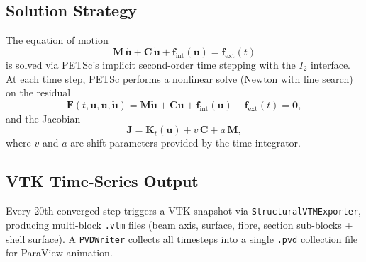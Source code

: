 \subsection{Solution Strategy}

The equation of motion
\begin{equation}
  \mathbf{M}\,\ddot{\mathbf{u}} + \mathbf{C}\,\dot{\mathbf{u}}
  + \mathbf{f}_{\text{int}}(\mathbf{u})
  = \mathbf{f}_{\text{ext}}(t)
\end{equation}
is solved via PETSc's implicit second-order time stepping with the
$I_2$ interface.  At each time step, PETSc performs a nonlinear solve
(Newton with line search) on the residual
\begin{equation}
  \mathbf{F}(t, \mathbf{u}, \dot{\mathbf{u}}, \ddot{\mathbf{u}})
  = \mathbf{M}\ddot{\mathbf{u}} + \mathbf{C}\dot{\mathbf{u}}
    + \mathbf{f}_{\text{int}}(\mathbf{u})
    - \mathbf{f}_{\text{ext}}(t) = \mathbf{0},
\end{equation}
and the Jacobian
\begin{equation}
  \mathbf{J} = \mathbf{K}_t(\mathbf{u})
             + v\,\mathbf{C}
             + a\,\mathbf{M},
\end{equation}
where $v$ and $a$ are shift parameters provided by the time integrator.

\subsection{VTK Time-Series Output}

Every 20th converged step triggers a VTK snapshot via
\texttt{StructuralVTMExporter}, producing multi-block \texttt{.vtm}
files (beam axis, surface, fibre, section sub-blocks + shell surface).
A \texttt{PVDWriter} collects all timesteps into a single \texttt{.pvd}
collection file for ParaView animation.
